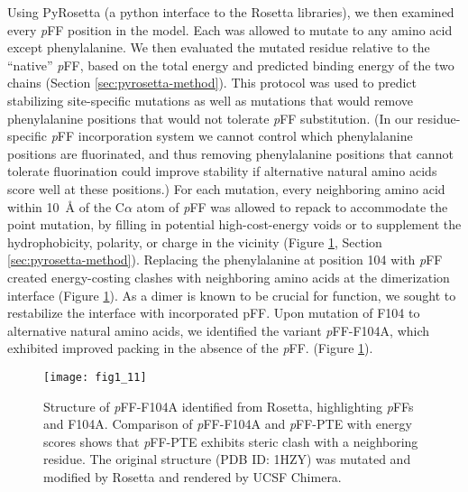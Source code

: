 \begin{refsection}
Using PyRosetta (a python interface to the Rosetta
libraries)\cite{Leaver-Fay2011}, we then examined every \emph{p}FF position in
the model. Each was allowed to mutate to any amino acid except phenylalanine.
We then evaluated the mutated residue relative to the “native” \emph{p}FF,
based on the total energy and predicted binding energy of the two chains
(Section \ref{sec:pyrosetta-method}). This protocol was used to predict
stabilizing site-specific mutations as well as mutations that would remove
phenylalanine positions that would not tolerate \emph{p}FF substitution. (In
our residue-specific \emph{p}FF incorporation system we cannot control which
phenylalanine positions are fluorinated, and thus removing phenylalanine
positions that cannot tolerate fluorination could improve stability if
alternative natural amino acids score well at these positions.) For each
mutation, every neighboring amino acid within \SI{10}{\AA} of the C$\alpha$
atom of \emph{p}FF was allowed to repack to accommodate the point mutation, by
filling in potential high-cost-energy voids or to supplement the
hydrophobicity, polarity, or charge in the vicinity (Figure
\ref{fig:rosetta-pte}, Section \ref{sec:pyrosetta-method}).  Replacing the
phenylalanine at position 104 with \emph{p}FF created energy-costing clashes
with neighboring amino acids at the dimerization interface (Figure
\ref{fig:rosetta-pte}). As a dimer is known to be crucial for
function\cite{Baker2011b}, we sought to restabilize the interface with
incorporated pFF. Upon mutation of F104 to alternative natural amino acids, we
identified the variant \emph{p}FF-F104A, which exhibited improved packing in
the absence of the \emph{p}FF. (Figure \ref{fig:rosetta-pte}).

\begin{figure}[h!] \centering \texttt{[image: fig1\_11]}
    \caption[Structure of \emph{p}FF-F104A identified from Rosetta,
        highlighting \emph{p}FFs and F104A. Comparison of \emph{p}FF-F104A and
        \emph{p}FF-PTE with energy scores shows that \emph{p}FF-PTE exhibits
        steric clash with a neighboring residue.  The original structure (PDB
        ID: 1HZY) was mutated and modified by Rosetta and rendered by UCSF
    Chimera.]{Structure of \emph{p}FF-F104A identified from Rosetta,
    highlighting \emph{p}FFs and F104A. Comparison of \emph{p}FF-F104A and
    \emph{p}FF-PTE with energy scores shows that \emph{p}FF-PTE exhibits steric
    clash with a neighboring residue. The original structure (PDB ID: 1HZY) was
    mutated and modified by Rosetta and rendered by UCSF Chimera.}
    \label{fig:rosetta-pte}
\end{figure}


\end{refsection}
